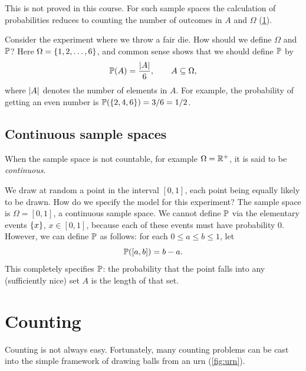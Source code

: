 This is not proved in this course. For such sample spaces the calculation of probabilities reduces to counting the number of outcomes in $A$ and $\Omega$ (\cref{sec:counting}).

\begin{example}\label{ex:fair-die}
Consider the experiment where we throw a fair die. How should we define $\Omega$ and $\mathbb{P}$? Here $\Omega = \left\{ 1, 2, \ldots, 6 \right\}$, and common sense shows that we should define $\mathbb{P}$ by
\[
  \mathbb{P}(A) = \frac{\lvert A\rvert}{6}, \qquad A \subseteq \Omega,
\]
where $\lvert A\rvert$ denotes the number of elements in $A$. For example, the probability of getting an even number is $\mathbb{P}(\left\{ 2, 4, 6 \right\}) = 3/6 = 1/2$.
\end{example}

\subsection{Continuous sample spaces}\label{sec:continuous-sample-spaces}

When the sample space is not countable, for example $\Omega = \mathbb{R}^{+}$, it is said to be \emph{continuous}.

\begin{example}\label{ex:point-in-interval}
We draw at random a point in the interval $[0, 1]$, each point being equally likely to be drawn. How do we specify the model for this experiment? The sample space is $\Omega = [0, 1]$, a continuous sample space. We cannot define $\mathbb{P}$ via the elementary events $\left\{ x \right\}$, $x \in [0, 1]$, because each of these events must have probability 0. However, we can define $\mathbb{P}$ as follows: for each $0 \le a \le b \le 1$, let
\[
  \mathbb{P}([a, b]) = b - a.
\]
This completely specifies $\mathbb{P}$: the probability that the point falls into any (sufficiently nice) set $A$ is the length of that set.
\end{example}

\section{Counting}\label{sec:counting}

Counting is not always easy. Fortunately, many counting problems can be cast into the simple framework of drawing balls from an urn (\cref{fig:urn}).

